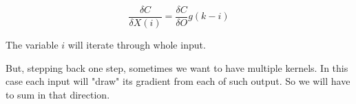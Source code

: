 \documentclass{article}
\begin{document}
\begin{equation}
	\frac{\delta C}{\delta X(i)} = \frac{\delta C}{\delta O}g(k-i)
\end{equation}

The variable $i$ will iterate through whole input.

But, stepping back one step, sometimes we want to have multiple kernels. In this case each input will "draw" its gradient from each of such output. So we will have to sum in that direction.
	
\end{document}
